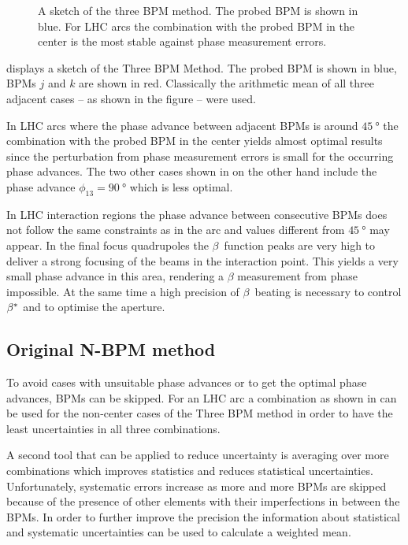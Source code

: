 \begin{figure}
    \centering
     
    \caption{A sketch of the three BPM method. The probed BPM is shown in blue. For LHC arcs the
    combination with the probed BPM in the center is the most stable against phase measurement errors.}
    \label{fig_threebpm}
\end{figure}

 displays a sketch of the Three BPM Method. The probed BPM is shown in blue,
BPMs $j$ and $k$ are shown in red.
Classically the arithmetic mean of all three adjacent cases -- as shown in the figure -- were used.


In LHC arcs where the phase advance between adjacent BPMs is around
$\SI{45}{\degree}$ the combination with the probed BPM in the center yields almost optimal results
since the perturbation from phase measurement errors is small for the occurring phase advances.
The two other cases shown in  on the other hand include the 
phase advance $\phi_{13} = \SI{90}{\degree}$ which is less optimal.

In LHC interaction regions the phase advance between consecutive BPMs does not follow the same constraints
as in the arc and values different from $\SI{45}{\degree}$ may appear. In the final focus quadrupoles
the $\beta$~function peaks are very high to deliver a strong focusing of the beams in the interaction
point. This yields a very small phase advance in this area, rendering a $\beta$ measurement from phase
impossible. At the same time a high precision of $\beta$~beating is necessary to control $\beta^*$ and
to optimise the aperture.

\subsection{Original N-BPM method}

To avoid cases with unsuitable phase advances or to get the optimal phase advances, BPMs can be
skipped. For an LHC arc a combination as shown in  can be used for the non-center
cases of the Three BPM method in order to have the least uncertainties in all three combinations.

A second tool that can be applied to reduce uncertainty is averaging over more combinations which
improves statistics and reduces statistical uncertainties.
Unfortunately, systematic errors increase
as more and more BPMs are skipped because of the presence of other elements with their imperfections in between the
BPMs.
In order to further improve the precision the information about statistical and systematic
uncertainties can be used to calculate a weighted mean. 

